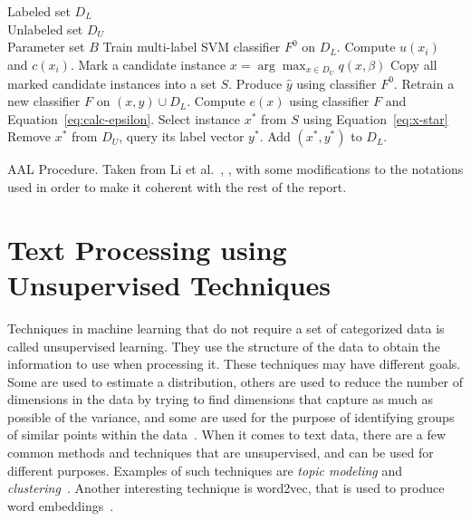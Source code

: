 \begin{algorithm}
    \begin{algorithmic}
        \REQUIRE Labeled set $D_L$ \\ 
                 Unlabeled set $D_U$ \\ 
                 Parameter set $B$
        \REPEAT
            \STATE Train multi-label SVM classifier $F^0$ on $D_L$.
                \STATE Compute $u(x_i)$ and $c(x_i)$.
            \ENDFOR
                \STATE Mark a candidate instance $x = \arg\max_{x \in D_U} q(x, \beta)$
            \ENDFOR
            \STATE Copy all marked candidate instances into a set $S$.
                \STATE Produce $\hat{y}$ using classifier $F^0$.
                \STATE Retrain a new classifier $F$ on $(x, \hat{y}) \cup D_L$.
                \STATE Compute $e(x)$ using classifier $F$ and Equation~\ref{eq:calc-epsilon}.
            \ENDFOR
            \STATE Select instance $x^*$ from $S$ using Equation~\ref{eq:x-star}
            \STATE Remove $x^*$ from $D_U$, query its label vector $y^*$.
            \STATE Add $(x^*, y^*)$ to $D_L$.
    \end{algorithmic}

    \caption{AAL Procedure. Taken from Li et al\@.~\cite{li2013active}, , with some modifications to the notations used in order to make it coherent with the rest of the report.}
    \label{alg:adaptive-active-learning}
\end{algorithm}


\section{Text Processing using Unsupervised Techniques}

Techniques in machine learning that do not require a set of categorized data is called unsupervised learning.
They use the structure of the data to obtain the information to use when processing it.
These techniques may have different goals.
Some are used to estimate a distribution, others are used to reduce the number of dimensions in the data by trying to find dimensions that capture as much as possible of the variance, and some are used for the purpose of identifying groups of similar points within the data~\cite{bishop2006pattern}.
When it comes to text data, there are a few common methods and techniques that are unsupervised, and can be used for different purposes.
Examples of such techniques are \textit{topic modeling} and \textit{clustering}~\cite{aggarwal2012survey, crain2012dimensionality}.
Another interesting technique is word2vec, that is used to produce word embeddings~\cite{mikolov2013efficient}.

